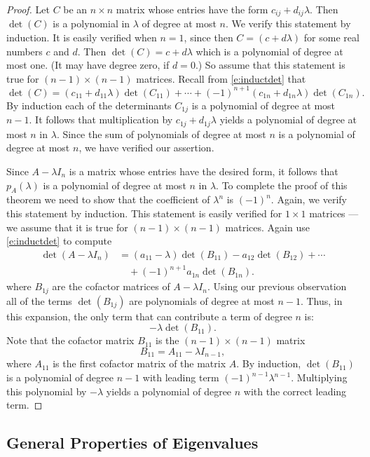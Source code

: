 \documentclass{ximera}
\begin{document}
\begin{proof} Let $C$ be an $n\times n$ matrix whose entries have
the form $c_{ij}+d_{ij}\lambda$.  Then $\det(C)$ is a polynomial
in $\lambda$ of degree at most $n$.  We verify this statement by
induction. It is easily verified when $n=1$, since then
$C=(c+d\lambda)$ for some real numbers $c$ and $d$. Then
$\det(C)=c+d\lambda$ which is a polynomial of degree at most
one.  (It may have degree zero, if $d=0$.) So assume that this
statement is true for $(n-1)\times (n-1)$ matrices. Recall from
\eqref{e:inductdet} that 
\[
\det(C) = (c_{11}+d_{11}\lambda)\det(C_{11})
+\cdots+(-1)^{n+1}(c_{1n}+d_{1n}\lambda)\det(C_{1n}).
\]    
By induction each of the determinants $C_{1j}$ is a polynomial
of degree at most $n-1$.  It follows that multiplication by
$c_{1j}+d_{1j}\lambda$ yields a polynomial of degree at most $n$
in $\lambda$.  Since the sum of polynomials of degree at most
$n$ is a polynomial of degree at most $n$, we have verified our
assertion.

Since $A-\lambda I_n$ is a matrix whose entries have the
desired form, it follows that $p_A(\lambda)$ is a polynomial of
degree at most $n$ in $\lambda$.  To complete the proof of this
theorem we need to show that the coefficient of $\lambda^n$ is
$(-1)^n$.  Again, we verify this statement by induction.  This
statement is easily verified for $1\times 1$ matrices --- we
assume that it is true for $(n-1)\times (n-1)$ matrices.  Again
use \eqref{e:inductdet} to compute
\begin{align*}
\det(A-\lambda I_n) &= (a_{11}-\lambda)\det(B_{11})-a_{12}\det(B_{12}) 
                      +\cdots \\
  &\quad +(-1)^{n+1}a_{1n}\det(B_{1n}).
\end{align*}
where $B_{1j}$ are the cofactor  matrices of
$A-\lambda I_n$.  Using our previous observation all of the
terms $\det(B_{1j})$ are polynomials of degree at most $n-1$.
Thus, in this expansion, the only term that can contribute a
term of degree $n$ is:
\[
-\lambda\det(B_{11}).
\]
Note that the cofactor matrix $B_{11}$ is the $(n-1)\times
(n-1)$ matrix
\[
B_{11} = A_{11} -\lambda I_{n-1},
\]
where $A_{11}$ is the first cofactor matrix of the matrix $A$.
By induction, $\det(B_{11})$ is a polynomial of degree $n-1$ with
leading term $(-1)^{n-1}\lambda^{n-1}$.  Multiplying this
polynomial by $-\lambda$ yields a polynomial of degree $n$ with
the correct leading term.  \end{proof}

\subsection*{General Properties of Eigenvalues}
\end{document}

